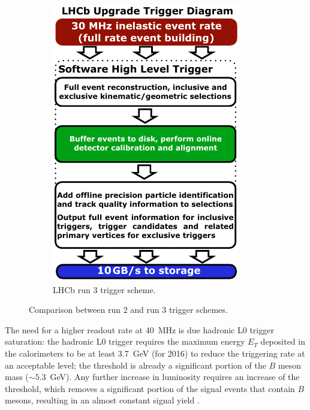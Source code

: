 \begin{figure}[!htb]
\begin{subfigure}[t]{0.36\textwidth}
        \includegraphics[width=\textwidth]{./figs-lhcb-upgrade-overview/trigger/trigger_scheme_run3.pdf}
        \caption{LHCb run 3 trigger scheme.}
    \end{subfigure}

    \caption{
        Comparison between run 2 and run 3 trigger schemes.
    }
    \label{fig:trigger-comp}
\end{figure}

The need for a higher readout rate at 40~MHz is due hadronic L0 trigger
saturation:
the hadronic L0 trigger requires the maximum energy $E_T$ deposited in the
calorimeters to be at least 3.7~GeV (for 2016) to reduce the triggering rate
at an acceptable level;
the threshold is already a significant portion of the $B$ meson mass
($\sim 5.3$~GeV).
Any further increase in luminosity requires an increase of the threshold,
which removes a significant portion of the signal events
that contain $B$ mesons,
resulting in an almost constant signal yield \cite{CERN-LHCC-2011-001}.


